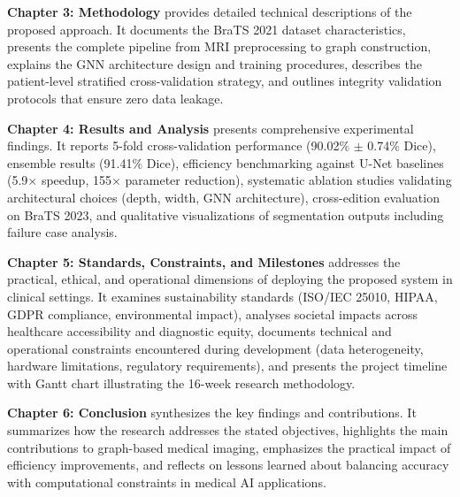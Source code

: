 \documentclass{article}
\begin{document}
\textbf{Chapter 3: Methodology} provides detailed technical descriptions of the proposed approach. It documents the BraTS 2021 dataset characteristics, presents the complete pipeline from MRI preprocessing to graph construction, explains the GNN architecture design and training procedures, describes the patient-level stratified cross-validation strategy, and outlines integrity validation protocols that ensure zero data leakage.

\textbf{Chapter 4: Results and Analysis} presents comprehensive experimental findings. It reports 5-fold cross-validation performance (90.02\% $\pm$ 0.74\% Dice), ensemble results (91.41\% Dice), efficiency benchmarking against U-Net baselines (5.9$\times$ speedup, 155$\times$ parameter reduction), systematic ablation studies validating architectural choices (depth, width, GNN architecture), cross-edition evaluation on BraTS 2023, and qualitative visualizations of segmentation outputs including failure case analysis.

\textbf{Chapter 5: Standards, Constraints, and Milestones} addresses the practical, ethical, and operational dimensions of deploying the proposed system in clinical settings. It examines sustainability standards (ISO/IEC 25010, HIPAA, GDPR compliance, environmental impact), analyses societal impacts across healthcare accessibility and diagnostic equity, documents technical and operational constraints encountered during development (data heterogeneity, hardware limitations, regulatory requirements), and presents the project timeline with Gantt chart illustrating the 16-week research methodology.

\textbf{Chapter 6: Conclusion} synthesizes the key findings and contributions. It summarizes how the research addresses the stated objectives, highlights the main contributions to graph-based medical imaging, emphasizes the practical impact of efficiency improvements, and reflects on lessons learned about balancing accuracy with computational constraints in medical AI applications.


\vspace{5mm}
\end{document}
